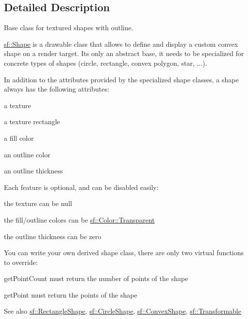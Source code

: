 \subsection{Detailed Description}
Base class for textured shapes with outline. 

\begin{DoxyVerb}\end{DoxyVerb}


\mbox{\hyperlink{classsf_1_1_shape}{sf\+::\+Shape}} is a drawable class that allows to define and display a custom convex shape on a render target. It\textquotesingle{}s only an abstract base, it needs to be specialized for concrete types of shapes (circle, rectangle, convex polygon, star, ...).

In addition to the attributes provided by the specialized shape classes, a shape always has the following attributes\+: \begin{DoxyItemize}
\item a texture \item a texture rectangle \item a fill color \item an outline color \item an outline thickness\end{DoxyItemize}
Each feature is optional, and can be disabled easily\+: \begin{DoxyItemize}
\item the texture can be null \item the fill/outline colors can be \mbox{\hyperlink{classsf_1_1_color_a569b45471737f770656f50ae7bbac292}{sf\+::\+Color\+::\+Transparent}} \item the outline thickness can be zero\end{DoxyItemize}
You can write your own derived shape class, there are only two virtual functions to override\+: \begin{DoxyItemize}
\item get\+Point\+Count must return the number of points of the shape \item get\+Point must return the points of the shape\end{DoxyItemize}
\begin{DoxySeeAlso}{See also}
\mbox{\hyperlink{classsf_1_1_rectangle_shape}{sf\+::\+Rectangle\+Shape}}, \mbox{\hyperlink{classsf_1_1_circle_shape}{sf\+::\+Circle\+Shape}}, \mbox{\hyperlink{classsf_1_1_convex_shape}{sf\+::\+Convex\+Shape}}, \mbox{\hyperlink{classsf_1_1_transformable}{sf\+::\+Transformable}} \begin{DoxyVerb}\end{DoxyVerb}
 
\end{DoxySeeAlso}


